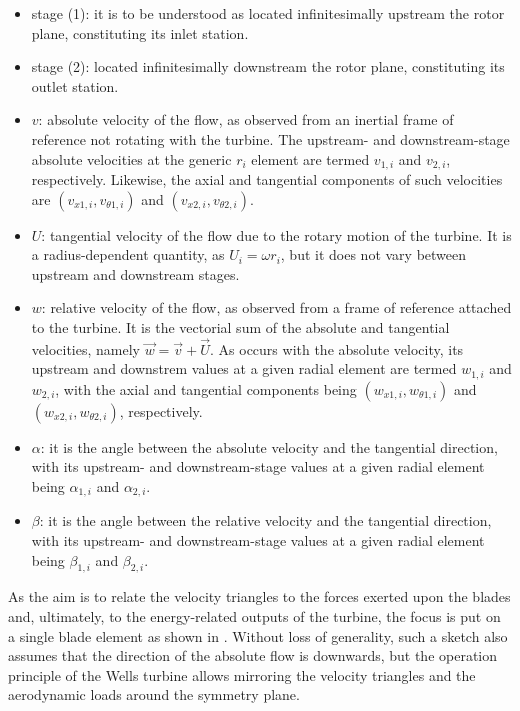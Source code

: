 \begin{itemize}
	\item{stage (1): it is to be understood as located infinitesimally upstream the rotor plane, constituting its inlet station.}
	\item{stage (2): located infinitesimally downstream the rotor plane, constituting its outlet station.}
	\item{$v$: absolute velocity of the flow, as observed from an inertial frame of reference not rotating with the turbine. The upstream- and downstream-stage absolute velocities at the generic $r_{i}$ element are termed $v_{1,i}$ and $v_{2,i}$, respectively. Likewise, the axial and tangential components of such velocities are $\left(v_{x1,i}, v_{\theta1,i}\right)$ and $\left(v_{x2,i}, v_{\theta2,i}\right)$.}
	\item{$U$: tangential velocity of the flow due to the rotary motion of the turbine. It is a radius-dependent quantity, as $U_{i}=\omega{r_{i}}$, but it does not vary between upstream and downstream stages.}
	\item{$w$: relative velocity of the flow, as observed from a frame of reference attached to the turbine. It is the vectorial sum of the absolute and tangential velocities, namely $\overrightarrow{w}=\overrightarrow{v} + \overrightarrow{U}$. As occurs with the absolute velocity, its upstream and downstrem values at a given radial element are termed $w_{1,i}$ and $w_{2,i}$, with the axial and tangential components being $\left(w_{x1,i}, w_{\theta1,i}\right)$ and $\left(w_{x2,i}, w_{\theta2,i}\right)$, respectively.}
	\item{$\alpha$: it is the angle between the absolute velocity and the tangential direction, with its upstream- and downstream-stage values at a given radial element being $\alpha_{1,i}$ and $\alpha_{2,i}$.}
	\item{$\beta$: it is the angle between the relative velocity and the tangential direction, with its upstream- and downstream-stage values at a given radial element being $\beta_{1,i}$ and $\beta_{2,i}$.}
\end{itemize}
As the aim is to relate the velocity triangles to the forces exerted upon the blades and, ultimately, to the energy-related outputs of the turbine, the focus is put on a single blade element as shown in . Without loss of generality, such a sketch also assumes that the direction of the absolute flow is downwards, but the operation principle of the Wells turbine allows mirroring the velocity triangles and the aerodynamic loads around the symmetry plane.

